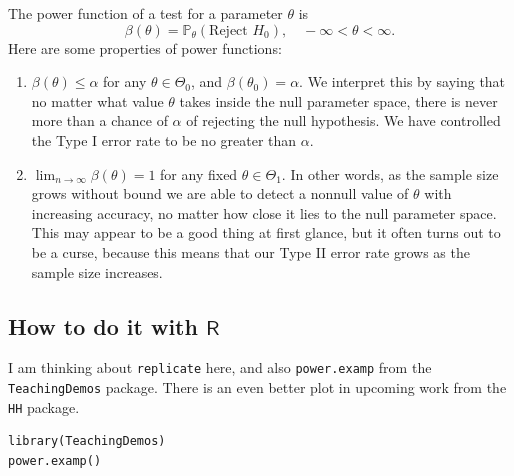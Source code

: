 \documentclass[captions=tableheading]{scrbook}
\begin{document}
The power function of a test for a parameter \(\theta\) is
\[
\beta(\theta)=\mathbb{P}_{\theta}(\mbox{Reject }H_{0}),\quad -\infty < \theta < \infty.
\]
Here are some properties of power functions:
\begin{enumerate}
\item \(\beta(\theta)\leq\alpha\) for any \(\theta\in\Theta_{0}\), and \(\beta(\theta_{0})=\alpha\). We interpret this by saying that no matter what value \(\theta\) takes inside the null parameter space, there is never more than a chance of \(\alpha\) of rejecting the null hypothesis. We have controlled the Type I error rate to be no greater than \(\alpha\).
\item \(\lim_{n\to\infty}\beta(\theta)=1\) for any fixed \(\theta\in\Theta_{1}\). In other words, as the sample size grows without bound we are able to detect a nonnull value of \(\theta\) with increasing accuracy, no matter how close it lies to the null parameter space. This may appear to be a good thing at first glance, but it often turns out to be a curse, because this means that our Type II error rate grows as the sample size increases.
\end{enumerate}
\subsection{How to do it with \(\mathsf{R}\)}
\label{sec-10-7-1}


I am thinking about \texttt{replicate} here, and also \texttt{power.examp} from the \texttt{TeachingDemos} package. There is an even better plot in upcoming work from the \texttt{HH} package.


\lstset{language=R}
\begin{lstlisting}
library(TeachingDemos)
power.examp()
\end{lstlisting}
\end{document}
